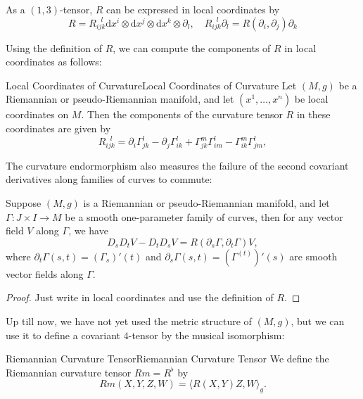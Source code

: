 \documentclass[../main.tex]{subfiles}
\begin{document}
As a $(1, 3)$-tensor, $R$ can be expressed in local coordinates by
\begin{equation}
	R = R_{ijk}^{\ \ \ l} \mathrm{d} x^i \otimes \mathrm{d} x^j \otimes \mathrm{d} x^k \otimes \partial_l, \quad R_{ijk}^{\ \ \ l} \partial_l = R(\partial_i, \partial_j) \partial_k 
\end{equation}

Using the definition of $R$, we can compute the components of $R$ in local coordinates as follows:
\begin{proposition}{Local Coordinates of Curvature}{Local Coordinates of Curvature}
	Let $(M, g)$ be a Riemannian or pseudo-Riemannian manifold, and let $(x^1, \ldots, x^n)$ be local coordinates on $M$. Then the components of the curvature tensor $R$ in these coordinates are given by
	\begin{equation}
		R_{ijk}^{\ \ \ l} = \partial_i \Gamma_{jk}^l - \partial_j \Gamma_{ik}^l + \Gamma_{jk}^m \Gamma_{im}^l - \Gamma_{ik}^m \Gamma_{jm}^l,
	\end{equation}
\end{proposition}

The curvature endormorphism also measures the failure of the second covariant derivatives along families of curves to commute:

\begin{proposition}{}{}
	Suppose $(M, g)$ is a Riemannian or pseudo-Riemannian manifold, and let $\Gamma: J \times I \to M$ be a smooth one-parameter family of curves, then for any vector field $V$ along $\Gamma$, we have
	\begin{equation}
		D_s D_t V - D_t D_s V = R(\partial_s \Gamma, \partial_t \Gamma) V,
	\end{equation}
	where $\partial_t \Gamma(s, t) = (\Gamma_s)'(t)$ and $\partial_s \Gamma(s, t) = (\Gamma^{(t)})'(s)$ are smooth vector fields along $\Gamma$.
\end{proposition}
\begin{proof}
	Just write in local coordinates and use the definition of $R$.
\end{proof}

Up till now, we have not yet used the metric structure of $(M, g)$, but we can use it to define a covariant $4$-tensor by the musical isomorphism:
\begin{definition}{Riemannian Curvature Tensor}{Riemannian Curvature Tensor}
	We define the Riemannian curvature tensor $Rm = R^{\flat}$ by
	\begin{equation}
		Rm(X, Y, Z, W) = \langle R(X, Y)Z, W \rangle_g.
	\end{equation}
\end{definition}
\end{document}
